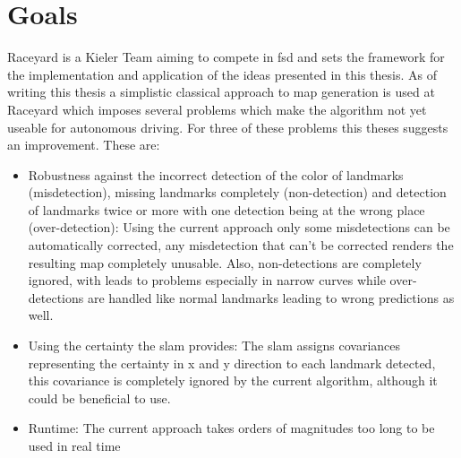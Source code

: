 


\section{Goals}
Raceyard is a Kieler Team aiming to compete in \ac{fsd} and sets the framework for the implementation and application of the ideas presented in this thesis. As of writing this thesis a simplistic classical approach to map generation is used at Raceyard which imposes several problems which make the algorithm not yet useable for autonomous driving. For three of these problems this theses suggests an improvement. These are:

\begin{itemize}
    \item Robustness against the incorrect detection of the color of landmarks (misdetection), missing landmarks completely (non-detection) and detection of landmarks twice or more with one detection being at the wrong place (over-detection): Using the current approach only some misdetections can be automatically corrected, any misdetection that can't be corrected renders the resulting map completely unusable. Also, non-detections are completely ignored, with leads to problems especially in narrow curves while over-detections are handled like normal landmarks leading to wrong predictions as well.
    \item Using the certainty the \ac{slam} provides: The \ac{slam} assigns covariances representing the certainty in x and y direction to each landmark detected, this covariance is completely ignored by the current algorithm, although it could be beneficial to use.
    \item Runtime: The current approach takes orders of magnitudes too long to be used in real time
\end{itemize}

